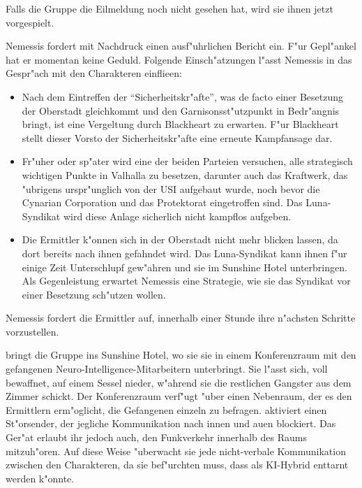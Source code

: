
Falls die Gruppe die Eilmeldung noch nicht gesehen hat, wird sie ihnen jetzt vorgespielt.


Nemessis fordert mit Nachdruck einen ausf"uhrlichen Bericht ein. F"ur Gepl"ankel hat er momentan keine Geduld. Folgende Einsch"atzungen l"asst Nemessis in das Gespr"ach mit den Charakteren einflie\3en:

\begin{itemize}
	\item Nach dem Eintreffen der ``Sicherheitskr"afte'', was de facto einer Besetzung der Oberstadt gleichkommt und den Garnisonsst"utzpunkt 
		in Bedr"angnis bringt, ist eine Vergeltung durch Blackheart zu erwarten. F"ur Blackheart stellt dieser Vorsto\3 der Sicherheitskr"afte eine erneute Kampfansage dar.
	\item Fr"uher oder sp"ater wird eine der beiden Parteien versuchen, alle strategisch wichtigen Punkte in Valhalla zu besetzen, darunter 
		auch das Kraftwerk, das "ubrigens urspr"unglich von der USI aufgebaut wurde, noch bevor die Cynarian Corporation und das Protektorat eingetroffen sind. Das Luna-Syndikat wird diese Anlage sicherlich nicht kampflos aufgeben.
	\item Die Ermittler k"onnen sich in der Oberstadt nicht mehr blicken lassen, da dort bereits nach ihnen gefahndet wird. Das 
		Luna-Syndikat kann ihnen f"ur einige Zeit Unterschlupf gew"ahren und sie im Sunshine Hotel unterbringen. Als Gegenleistung erwartet Nemessis eine Strategie, wie sie das Syndikat vor einer Besetzung sch"utzen wollen.
\end{itemize}

Nemessis fordert die Ermittler auf, innerhalb einer Stunde ihre n"achsten Schritte vorzustellen.


\xl{} bringt die Gruppe ins Sunshine Hotel, wo sie sie in einem Konferenzraum mit den gefangenen Neuro-Intelligence-Mitarbeitern unterbringt. Sie l"asst sich, voll bewaffnet, auf einem Sessel nieder, w"ahrend sie die restlichen Gangster aus dem Zimmer schickt. Der Konferenzraum verf"ugt "uber einen Nebenraum, der es den Ermittlern erm"oglicht, die Gefangenen einzeln zu befragen. \xl{} aktiviert einen St"orsender, der jegliche Kommunikation nach innen und au\3en blockiert. Das Ger"at erlaubt ihr jedoch auch, den Funkverkehr innerhalb des Raums mitzuh"oren. Auf diese Weise "uberwacht sie jede nicht-verbale Kommunikation zwischen den Charakteren, da sie bef"urchten muss, dass \ml{} als KI-Hybrid enttarnt werden k"onnte.

